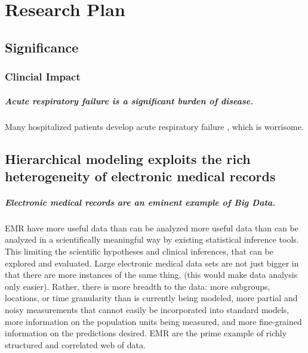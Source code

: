 \documentclass[]{article}
\title{}
\author{}
\date{}
\begin{document}
\maketitle


\section{Research Plan}\label{research-plan}

\subsection{Significance}\label{significance}

\subsubsection{Clincial Impact}\label{clincial-impact}

\subparagraph{Acute respiratory failure is a significant burden of
disease.}\label{acute-respiratory-failure-is-a-significant-burden-of-disease.}

Many hospitalized patients develop acute respiratory failure
\cite{shinystan}, which is worrisome.

\subsection{Hierarchical modeling exploits the rich heterogeneity of
electronic medical
records}\label{hierarchical-modeling-exploits-the-rich-heterogeneity-of-electronic-medical-records}

\subparagraph{Electronic medical records are an eminent example of Big
Data.}\label{electronic-medical-records-are-an-eminent-example-of-big-data.}

EMR have more useful data than can be analyzed more useful data than can
be analyzed in a scientifically meaningful way by existing statistical
inference tools. This limiting the scientific hypotheses and clinical
inferences, that can be explored and evaluated. Large electronic medical
data sets are not just bigger in that there are more instances of the
same thing, (this would make data analysis only easier). Rather, there
is more breadth to the data: more subgroups, locations, or time
granularity than is currently being modeled, more partial and noisy
measurements that cannot easily be incorporated into standard models,
more information on the population units being measured, and more
fine-grained information on the predictions desired. EMR are the prime
example of richly structured and correlated web of data.
\end{document}
